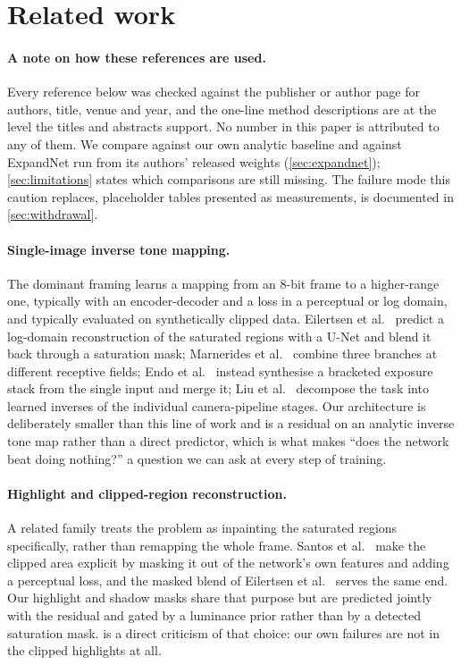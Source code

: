 \section{Related work}
\label{sec:related}

\paragraph{A note on how these references are used.}
Every reference below was checked against the publisher or author page for
authors, title, venue and year, and the one-line method descriptions are at the
level the titles and abstracts support. No number in this paper is attributed to
any of them. We compare against our own analytic baseline and against ExpandNet
run from its authors' released weights (\cref{sec:expandnet});
\cref{sec:limitations} states which comparisons are still missing. The failure
mode this caution replaces, placeholder tables presented as measurements, is
documented in \cref{sec:withdrawal}.

\paragraph{Single-image inverse tone mapping.}
The dominant framing learns a mapping from an 8-bit frame to a higher-range one,
typically with an encoder-decoder and a loss in a perceptual or log domain, and
typically evaluated on synthetically clipped data. Eilertsen et
al.~\citep{eilertsen2017} predict a log-domain reconstruction of the saturated
regions with a U-Net and blend it back through a saturation mask; Marnerides et
al.~\citep{marnerides2018} combine three branches at different receptive fields;
Endo et al.~\citep{endo2017} instead synthesise a bracketed exposure stack from
the single input and merge it; Liu et al.~\citep{liu2020} decompose the task into
learned inverses of the individual camera-pipeline stages. Our architecture is
deliberately smaller than this line of work and is a residual on an analytic
inverse tone map rather than a direct predictor, which is what makes ``does the
network beat doing nothing?'' a question we can ask at every step of training.

\paragraph{Highlight and clipped-region reconstruction.}
A related family treats the problem as inpainting the saturated regions
specifically, rather than remapping the whole frame. Santos et
al.~\citep{santos2020} make the clipped area explicit by masking it out of the
network's own features and adding a perceptual loss, and the masked blend of
Eilertsen et al.~\citep{eilertsen2017} serves the same end. Our highlight and
shadow masks share that purpose but are predicted jointly with the residual and
gated by a luminance prior rather than by a detected saturation mask.
 is a direct criticism of that choice: our own failures are
not in the clipped highlights at all.


